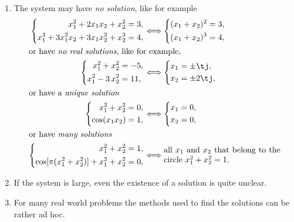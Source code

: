 \begin{enumerate}
\item The system may have \textit{no solution}, like for example
  \begin{align*}
    \left\{
      \begin{aligned}
        x_1^2 + 2 x_1 x_2 + x_2^2 & = 3, \\
        x_1^3 + 3 x_1^2 x_2 + 3 x_1 x_2^2 + x_2^3 & = 4,
      \end{aligned}
    \right. &  \Longleftrightarrow \left\{
      \begin{aligned}
        (x_1 + x_2)^2 & = 3, \\
        (x_1 + x_2)^3 & = 4,
      \end{aligned}
    \right. \\
  \intertext{or have \textit{no real solutions}, like for example,}
    \left\{
      \begin{aligned}
        x_1^2 + x_2^2 & = -5, \\
        x_1^2 - 3 \, x_2^2 & = 11,
      \end{aligned}
    \right. &  \Longleftrightarrow \left\{
      \begin{aligned}
        x_1 & = \pm \tj , \\
        x_2 & = \pm 2 \tj ,
      \end{aligned}
    \right. \\
  \intertext{or have a \textit{unique solution}}
    \left\{
      \begin{aligned}
        x_1^2 + x_2^2 & = 0, \\
        \cos(x_1 x_2) & = 1,
      \end{aligned}
    \right. &  \Longleftrightarrow \left\{
      \begin{aligned}
        x_1 = 0 , \\
        x_2 = 0 ,
      \end{aligned}
    \right. \\
  \intertext{or have \textit{many solutions}}
    \left\{
      \begin{aligned}
        x_1^2 + x_2^2 & = 1, \\
        \cos[\pi(x_1^2 + x_2^2)] + x_1^2 + x_2^2 & = 0,
      \end{aligned}
    \right. &  \Longleftrightarrow
    \parbox{50mm}{all $x_1$ and $x_2$ that belong to the circle $x_1^2 +
      x_2^2 = 1$.}
  \end{align*}
\item If the system is large, even the existence of a solution is
  quite unclear.
\item For many real world problems the methods used to find the
  solutions can be rather ad hoc.
\end{enumerate}

